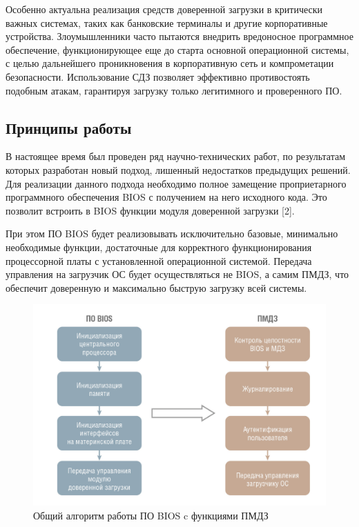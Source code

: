 Особенно актуальна реализация средств доверенной загрузки в критически важных 
системах, таких как банковские терминалы и другие корпоративные устройства. 
Злоумышленники часто пытаются внедрить вредоносное программное обеспечение, 
функционирующее еще до старта основной операционной системы, с целью дальнейшего 
проникновения в корпоративную сеть и компрометации безопасности. Использование 
СДЗ позволяет эффективно противостоять подобным атакам, гарантируя загрузку только
легитимного и проверенного ПО.

\newpage
\subsection{Принципы работы}

В настоящее время был проведен ряд научно-технических работ, по результатам которых
разработан новый подход, лишенный недостатков предыдущих решений. Для реализации 
данного подхода необходимо полное замещение проприетарного программного обеспечения 
BIOS с получением на него исходного кода. Это позволит встроить в BIOS функции 
модуля доверенной загрузки [2].

При этом ПО BIOS будет реализовывать исключительно базовые, минимально необходимые 
функции, достаточные для корректного функционирования процессорной платы с 
установленной операционной системой. Передача управления на загрузчик ОС будет 
осуществляться не BIOS, а самим ПМДЗ, что обеспечит доверенную и максимально 
быструю загрузку всей системы.

\begin{figure}[H]
  \centering
  \includegraphics[width=1\textwidth]{pict/8}
  \caption{Общий алгоритм работы ПО BIOS c функциями ПМДЗ}
  \label{fig:55}
\end{figure}

